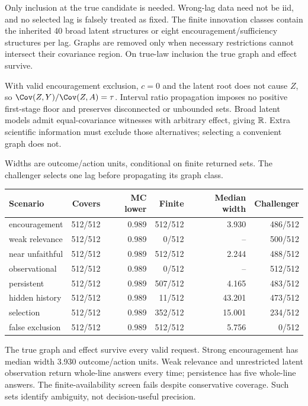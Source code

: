 Only inclusion at the true candidate is needed. Wrong-lag data need not be iid, and no selected lag is falsely treated as fixed. The finite innovation classes contain the inherited 40 broad latent structures or eight encouragement/sufficiency structures per lag. Graphs are removed only when necessary restrictions cannot intersect their covariance region. On true-law inclusion the true graph and effect survive.

With valid encouragement exclusion, $c=0$ and the latent root does not cause $Z$, so $\Cov(Z,Y)/\Cov(Z,A)=\tau$. Interval ratio propagation imposes no positive first-stage floor and preserves disconnected or unbounded sets. Broad latent models admit equal-covariance witnesses with arbitrary effect, giving $\mathbb R$. Extra scientific information must exclude those alternatives; selecting a convenient graph does not.

Widths are outcome/action units, conditional on finite returned sets. The challenger selects one lag before propagating its graph class.

\begin{center}\footnotesize\begin{tabular}{lrrrrr}\toprule
Scenario & Covers & MC lower & Finite & Median width & Challenger\\
\midrule
encouragement & 512/512 & 0.989 & 512/512 & 3.930 & 486/512 \\
weak relevance & 512/512 & 0.989 & 0/512 & -- & 500/512 \\
near unfaithful & 512/512 & 0.989 & 512/512 & 2.244 & 488/512 \\
observational & 512/512 & 0.989 & 0/512 & -- & 512/512 \\
persistent & 512/512 & 0.989 & 507/512 & 4.165 & 483/512 \\
hidden history & 512/512 & 0.989 & 11/512 & 43.201 & 473/512 \\
selection & 512/512 & 0.989 & 352/512 & 15.001 & 234/512 \\
false exclusion & 512/512 & 0.989 & 512/512 & 5.756 & 0/512 \\
\bottomrule\end{tabular}\end{center}


The true graph and effect survive every valid request. Strong encouragement has median width 3.930 outcome/action units. Weak relevance and unrestricted latent observation return whole-line answers every time; persistence has five whole-line answers. The finite-availability screen fails despite conservative coverage. Such sets identify ambiguity, not decision-useful precision.

